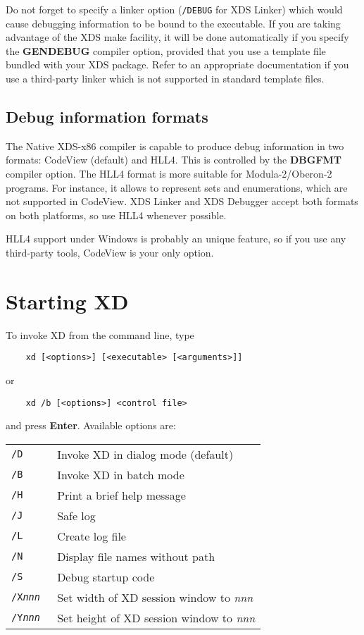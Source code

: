Do not forget to specify a linker option (\verb'/DEBUG' for XDS Linker)  %
which would cause debugging information to be bound to the executable.
If you are taking advantage of the XDS make facility, %
it will be done automatically if you specify the {\bf GENDEBUG} compiler option,
provided that you use a template file bundled with your XDS package.
Refer to an appropriate documentation if you use a third-party linker
which is not supported in standard template files.


\subsection{Debug information formats}

The Native XDS-x86 compiler is capable to produce debug information
in two formats: CodeView (default) and HLL4.
This is controlled by the {\bf DBGFMT} compiler
option. The HLL4 format is more suitable for Modula-2/Oberon-2
programs. For instance, it allows to represent sets and enumerations,
which are not supported in CodeView. XDS Linker and XDS Debugger
accept both formats on both platforms, so use HLL4 whenever possible.

HLL4 support under Windows is probably an unique feature,
so if you use any third-party tools, CodeView is your only option.

\section{Starting XD}
\label{start:invoking}

To invoke XD from the command line, type

\verb'    xd [<options>] [<executable> [<arguments>]]'

or

\verb'    xd /b [<options>] <control file>'

and press {\bf Enter}. Available options are:

\begin{tabular}{l|l}
\tt /D          & Invoke XD in dialog mode (default) \\
\tt /B          & Invoke XD in batch mode \\
\tt /H          & Print a brief help message \\
\tt /J          & Safe log \\
\tt /L          & Create log file \\
\tt /N          & Display file names without path \\
\tt /S          & Debug startup code \\
\tt /X{\it nnn} & Set width of XD session window to {\it nnn}  \\
\tt /Y{\it nnn} & Set height of XD session window to {\it nnn}
\end{tabular}

